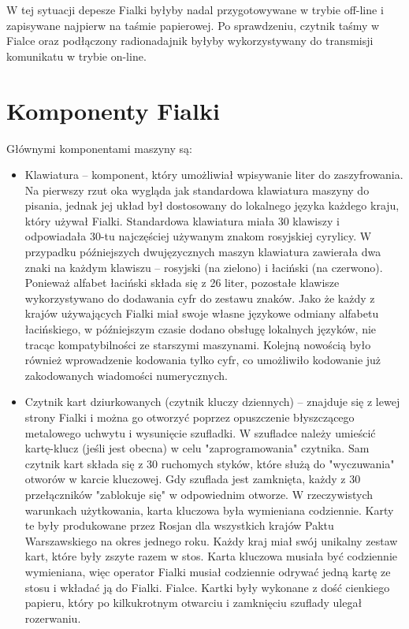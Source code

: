 \documentclass{article}
\begin{document}
W tej sytuacji depesze Fialki byłyby nadal przygotowywane w trybie off-line i zapisywane najpierw na taśmie papierowej. Po sprawdzeniu, czytnik taśmy w Fialce oraz podłączony radionadajnik byłyby wykorzystywany do transmisji komunikatu w trybie on-line.

\section{Komponenty Fialki}

Głównymi komponentami maszyny są: 

\begin{itemize}
\item Klawiatura – komponent, który umożliwiał wpisywanie liter do zaszyfrowania. Na pierwszy rzut oka wygląda jak standardowa klawiatura maszyny do pisania, jednak jej układ był dostosowany do lokalnego języka każdego kraju, który używał Fialki. Standardowa klawiatura miała 30 klawiszy i odpowiadała 30-tu najczęściej używanym znakom rosyjskiej cyrylicy. W przypadku późniejszych dwujęzycznych maszyn klawiatura zawierała dwa znaki na każdym klawiszu – rosyjski (na zielono) i łaciński (na czerwono). Ponieważ alfabet łaciński składa się z 26 liter, pozostałe klawisze wykorzystywano do dodawania cyfr do zestawu znaków. Jako że każdy z krajów używających Fialki miał swoje własne językowe odmiany alfabetu łacińskiego, w późniejszym czasie dodano obsługę lokalnych języków, nie tracąc kompatybilności ze starszymi maszynami. Kolejną nowością było również wprowadzenie kodowania tylko cyfr, co umożliwiło kodowanie już zakodowanych wiadomości numerycznych.
\item Czytnik kart dziurkowanych (czytnik kluczy dziennych) – znajduje się z lewej strony Fialki i można go otworzyć poprzez opuszczenie błyszczącego metalowego uchwytu i wysunięcie szufladki. W szufladce należy umieścić kartę-klucz (jeśli jest obecna) w celu "zaprogramowania" czytnika. Sam czytnik kart składa się z 30 ruchomych styków, które służą do "wyczuwania" otworów w karcie kluczowej. Gdy szuflada jest zamknięta, każdy z 30 przełączników "zablokuje się" w odpowiednim otworze. W rzeczywistych warunkach użytkowania, karta kluczowa była wymieniana codziennie. Karty te były produkowane przez Rosjan dla wszystkich krajów Paktu Warszawskiego na okres jednego roku. Każdy kraj miał swój unikalny zestaw kart, które były zszyte razem w stos. Karta kluczowa musiała być codziennie wymieniana, więc operator Fialki musiał codziennie odrywać jedną kartę ze stosu i wkładać ją do Fialki. Fialce. Kartki były wykonane z dość cienkiego papieru, który po kilkukrotnym otwarciu i zamknięciu szuflady ulegał rozerwaniu.

\end{itemize}
\end{document}
